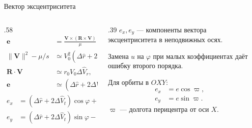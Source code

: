 \documentclass[11pt,aspectratio=169,t]{beamer}
\newcommand{\eqcompact}{\fontsize{10}{12}\selectfont}
\newcommand{\dvr}{\Delta\widehat V_r}
\newcommand{\dvt}{\Delta\widehat V_t}
\newcommand{\drh}{\Delta\widehat r}
\begin{document}
\begin{frame}{Вектор эксцентриситета}
\relax
\begin{columns}[T,onlytextwidth]
\begin{column}{.58\textwidth}
{\eqcompact\derivationmathspacing
\[
\begin{aligned}
 \boldsymbol e&=\frac{\boldsymbol V\times(\boldsymbol R\times\boldsymbol V)}{\mu}
                 -\frac{\boldsymbol R}{s},\\[6pt]
 \|\boldsymbol V\|^2-\mu/s&\simeq V_0^2(\drh+2\dvt),\\[3pt]
 \boldsymbol R\cdot\boldsymbol V&\simeq r_0V_0\dvr,\\[6pt]
 \boldsymbol e&\simeq(\drh+2\dvt)\boldsymbol e_r-\dvr\boldsymbol e_t.
\end{aligned}
\]
\[
\boxed{\begin{aligned}
 e_x&=(\drh+2\dvt)\cos\varphi+\dvr\sin\varphi,\\[4pt]
 e_y&=(\drh+2\dvt)\sin\varphi-\dvr\cos\varphi.
\end{aligned}}
\]
}
\end{column}
\begin{column}{.39\textwidth}
\RaggedRight
$e_x,e_y$ — компоненты вектора эксцентриситета в неподвижных осях.\par\medskip
Замена $u$ на $\varphi$ при малых коэффициентах даёт ошибку второго порядка.\par\medskip
Для орбиты в $OXY$:
{\eqcompact\derivationmathspacing
\[
\begin{aligned}e_x&=e\cos\varpi,\\e_y&=e\sin\varpi.\end{aligned}
\]
}
$\varpi$ — долгота перицентра от оси $X$.
\end{column}
\end{columns}
\end{frame}
\end{document}

